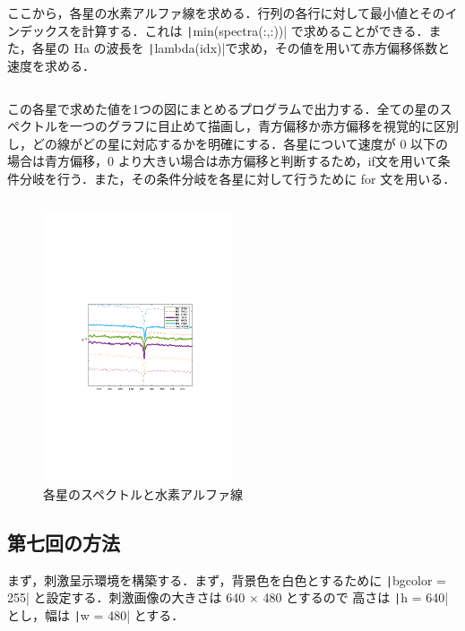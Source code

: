 \documentclass[dvipdfmx, titlepage, t]{jsarticle}
\begin{document}
    ここから，各星の水素アルファ線を求める．行列の各行に対して最小値とそのインデックスを計算する．これは \texttt|min(spectra(:,:))| で求めることができる．また，各星の Ha の波長を \texttt|lambda(idx)|で求め，その値を用いて赤方偏移係数と速度を求める．

    \inputminted[linenos, firstline=11, lastline=15, frame=lines, fontsize=\small]{matlab}{code/Exp3_6_2_Matlab.m}

    この各星で求めた値を1つの図にまとめるプログラムで出力する．全ての星のスペクトルを一つのグラフに目止めて描画し，青方偏移か赤方偏移を視覚的に区別し，どの線がどの星に対応するかを明確にする．各星について速度が 0 以下の場合は青方偏移，0 より大きい場合は赤方偏移と判断するため，if文を用いて条件分岐を行う．また，その条件分岐を各星に対して行うために for 文を用いる．
    \inputminted[linenos, firstline=16, lastline=27, frame=lines, fontsize=\small]{matlab}{code/Exp3_6_2_Matlab.m}

    \begin{figure}[H]
        \centering
        \includegraphics[width=0.5\textwidth]{figure/stellar2.pdf}
        \caption{各星のスペクトルと水素アルファ線}
        \label{fig:exp3_6_spectra2}
    \end{figure}

\subsection{第七回の方法}
    まず，刺激呈示環境を構築する．まず，背景色を白色とするために \texttt|bgcolor = 255| と設定する．刺激画像の大きさは 640 $\times$ 480 とするので 高さは \texttt|h = 640| とし，幅は \texttt|w = 480| とする．
\end{document}
